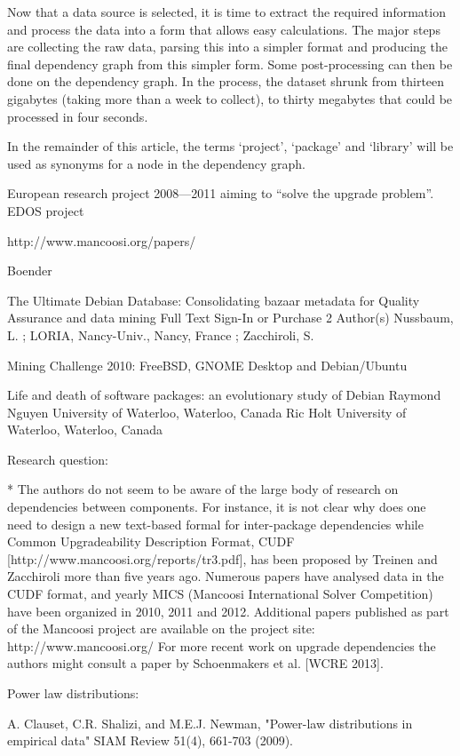 \documentclass[smallextended,final]{svjour3}
\begin{document}
Now that a data source is selected, it is time to extract the required information and process the data into a form that allows easy calculations. The major steps are collecting the raw data, parsing this into a simpler format and producing the final dependency graph from this simpler form. Some post-processing can then be done on the dependency graph. In the process, the dataset shrunk from thirteen gigabytes (taking more than a week to collect), to thirty megabytes that could be processed in four seconds.

In the remainder of this article, the terms `project', `package' and `library' will be used as synonyms for a node in the dependency graph.

European research project 2008—2011 aiming to ``solve the upgrade problem''.
EDOS project

http://www.mancoosi.org/papers/

Boender 

The Ultimate Debian Database: Consolidating bazaar metadata for Quality Assurance and data mining
Full Text Sign-In or Purchase
2 Author(s)
Nussbaum, L. ; LORIA, Nancy-Univ., Nancy, France ; Zacchiroli, S.

Mining Challenge 2010: FreeBSD, GNOME Desktop and Debian/Ubuntu


Life and death of software packages: an evolutionary study of Debian
Raymond Nguyen  University of Waterloo, Waterloo, Canada
Ric Holt        University of Waterloo, Waterloo, Canada


Research question:

* The authors do not seem to be aware of the large body of research on dependencies between components. For instance, it is not clear why does one need to design a new text-based formal for inter-package dependencies while Common Upgradeability Description Format, CUDF [http://www.mancoosi.org/reports/tr3.pdf], has been proposed by Treinen and Zacchiroli more than five years ago. Numerous papers have analysed data in the CUDF format, and yearly MICS (Mancoosi International Solver Competition) have been organized in 2010, 2011 and 2012. Additional papers published as part of the Mancoosi project are available on the project site: http://www.mancoosi.org/ For more recent work on upgrade dependencies the authors might consult a paper by Schoenmakers et al. [WCRE 2013].

Power law distributions:

A. Clauset, C.R. Shalizi, and M.E.J. Newman, "Power-law distributions in empirical data" SIAM Review 51(4), 661-703 (2009).
\end{document}

